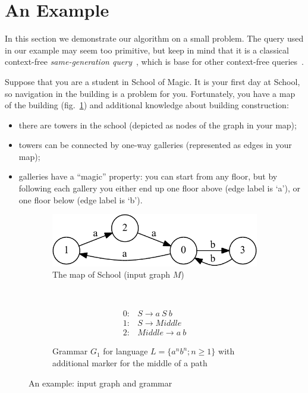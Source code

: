 \section{An Example}\label{motivExample}

In this section we demonstrate our algorithm on a small problem.
The query used in our example may seem too primitive, but keep in mind that it is a classical context-free \textit{same-generation query}~\cite{FndDB}, which is base for other context-free queries~\cite{GraphQueryWithEarley}.

Suppose that you are a student in School of Magic.
It is your first day at School, so navigation in the building is a problem for you.
Fortunately, you have a map of the building (fig.~\ref{input}) and additional knowledge about building construction:
\begin{itemize}
  \item there are towers in the school (depicted as nodes of the graph in your map);
  \item towers can be connected by one-way galleries (represented as edges in your map);
  \item galleries have a ``magic'' property: you can start from any floor, but by following each gallery you either end up one floor above (edge label is `a'), or one floor below (edge label is `b'). 
\end{itemize}

\begin{figure}[ht]
    \begin{center}
    \centering
    \begin{subfigure}[b]{0.45\textwidth}
        \includegraphics[width=\textwidth]{dot/input.pdf}
        \caption{The map of School (input graph $M$)}
        \label{input}        
        \vspace{1cm}
    \end{subfigure}
    ~   
    \begin{subfigure}[b]{0.45\textwidth}
   \[
\begin{array}{rl} 
   0:& S \rightarrow a \ S \ b \\
   1:& S \rightarrow Middle \\
   2:& Middle \rightarrow a \ b
\end{array}
\]
   \caption{Grammar $G_1$ for language $L=\{a^n b^n; n \geq 1\}$ with additional marker for the middle of a path}
   \label{grammarG}        
    \end{subfigure}
    \end{center}
\caption{An example: input graph and grammar}
\label{exampleData}
\end{figure}


